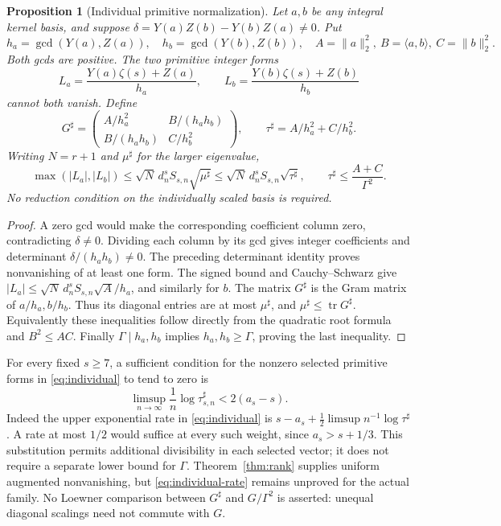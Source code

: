 \documentclass[11pt]{article}
\newtheorem{proposition}[theorem]{Proposition}
\theoremstyle{remark}
\begin{document}
\begin{proposition}[Individual primitive normalization]
Let \(a,b\) be any integral kernel basis, and suppose
\(\delta=Y(a)Z(b)-Y(b)Z(a)\ne0\). Put
\[
 h_a=\gcd(Y(a),Z(a)),\quad h_b=\gcd(Y(b),Z(b)),\quad
 A=\|a\|_2^2,\ B=\langle a,b\rangle,\ C=\|b\|_2^2.
\]
Both gcds are positive. The two primitive integer forms
\[
 L_a=\frac{Y(a)\zeta(s)+Z(a)}{h_a},\qquad
 L_b=\frac{Y(b)\zeta(s)+Z(b)}{h_b}
\]
cannot both vanish. Define
\[
 G^\sharp=\begin{pmatrix}
 A/h_a^2&B/(h_a h_b)\\ B/(h_a h_b)&C/h_b^2
 \end{pmatrix},\qquad
 \tau^\sharp=A/h_a^2+C/h_b^2.
\]
Writing \(N=r+1\) and \(\mu^\sharp\) for the larger eigenvalue,
\begin{equation}
 \max(|L_a|,|L_b|)
 \le\sqrt N\,d_n^s S_{s,n}\sqrt{\mu^\sharp}
 \le\sqrt N\,d_n^s S_{s,n}\sqrt{\tau^\sharp},
 \qquad
 \tau^\sharp\le\frac{A+C}{\Gamma^2}.
 \label{eq:individual}
\end{equation}
No reduction condition on the individually scaled basis is required.
\end{proposition}
\begin{proof}
A zero gcd would make the corresponding coefficient column zero,
contradicting \(\delta\ne0\). Dividing each column by its gcd gives
integer coefficients and determinant \(\delta/(h_a h_b)\ne0\).
The preceding determinant identity proves nonvanishing of at least one
form. The signed bound and Cauchy--Schwarz give
\( |L_a|\le\sqrt N\,d_n^s S_{s,n}\sqrt A/h_a\), and similarly
for \(b\). The matrix \(G^\sharp\) is the Gram matrix of
\(a/h_a,b/h_b\). Thus its diagonal entries are at most
\(\mu^\sharp\), and \(\mu^\sharp\le\operatorname{tr}G^\sharp\).
Equivalently these inequalities follow directly from the quadratic
root formula and \(B^2\le AC\). Finally \(\Gamma\mid h_a,h_b\)
implies \(h_a,h_b\ge\Gamma\), proving the last inequality.
\end{proof}

For every fixed \(s\ge7\), a sufficient condition for the nonzero
selected primitive forms in \eqref{eq:individual} to tend to zero is
\begin{equation}
 \limsup_{n\to\infty}\frac1n\log\tau^\sharp_{s,n}
       <2(a_s-s).
 \label{eq:individual-rate}
\end{equation}
Indeed the upper exponential rate in \eqref{eq:individual} is
\(s-a_s+\tfrac12\limsup n^{-1}\log\tau^\sharp\).
A rate at most \(1/2\) would suffice at every such weight, since
\(a_s>s+1/3\). This substitution permits additional divisibility
in each selected vector; it does not require a separate lower bound
for \(\Gamma\). Theorem~\ref{thm:rank} supplies uniform augmented
nonvanishing, but \eqref{eq:individual-rate} remains unproved for the
actual family. No Loewner comparison between
\(G^\sharp\) and \(G/\Gamma^2\) is asserted: unequal diagonal
scalings need not commute with \(G\).
\end{document}
